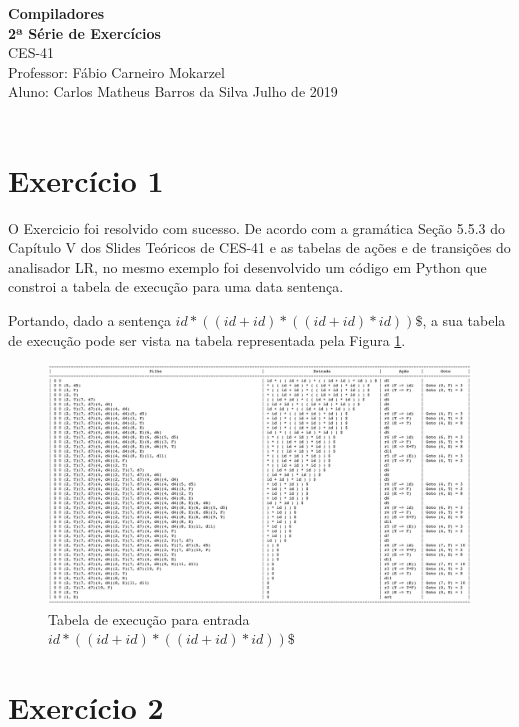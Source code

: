 \documentclass[a4paper, 10pt]{article}
\begin{document}
\noindent
\large
\textbf{Compiladores} \\
\textbf{2ª Série de Exercícios} \\
\normalsize CES-41  \\
Professor: Fábio Carneiro Mokarzel \\
Aluno: Carlos Matheus Barros da Silva \hfill Julho de 2019 \\ \\



\section*{Exercício 1}

O Exercicio foi resolvido com sucesso. De acordo com a gramática Seção 5.5.3 do Capítulo V dos Slides Teóricos de CES-41 e as tabelas de ações e de transições do analisador LR, no mesmo exemplo foi desenvolvido um código em Python que constroi a tabela de execução para uma data sentença.

Portando, dado a sentença $id * ((id + id) * ((id + id) * id)) \$$, a sua tabela de execução pode ser vista na tabela representada pela Figura \ref{fig:tabela}.

\begin{figure}[H]
  \begin{center}
  \includegraphics[width=\linewidth]{./../tabela.png}
  \caption{Tabela de execução para entrada $id * ((id + id) * ((id + id) * id)) \$$}
  \label{fig:tabela}
  \end{center}
\end{figure}

\section*{Exercício 2}
\end{document}
